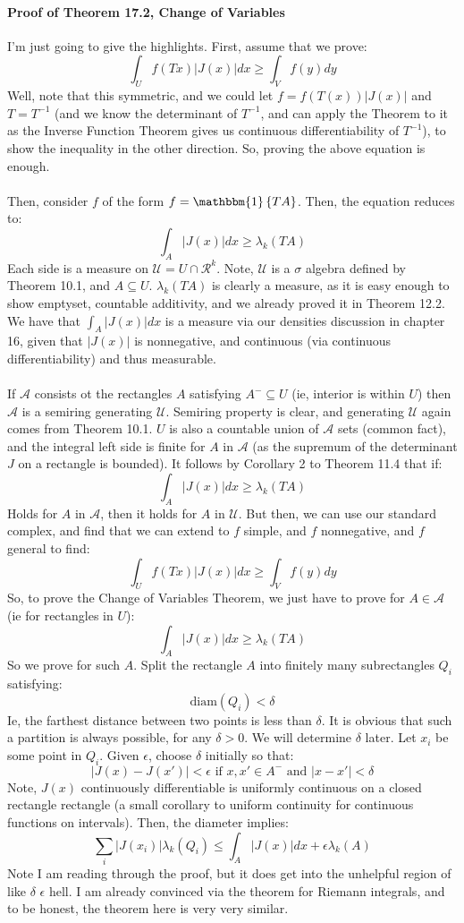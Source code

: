 \documentclass[12pt,a4paper]{article}
\newcommand{\1}[1]{\mathbbm{1}\left\{ #1 \right\}}
\newcommand{\acal}{\mathcal{A}}
\newcommand{\ucal}{\mathcal{U}}
\newcommand{\rcal}{\mathcal{R}}
\newcommand{\diam}{\text{diam}}
\begin{document}
\paragraph{Proof of Theorem 17.2, Change of Variables} 
I'm just going to give the highlights. First, assume that we prove:
$$
	\int_U f(Tx)|J(x)| dx \geq \int_V f(y) dy
$$
Well, note that this symmetric, and we could let $f = f(T(x))|J(x)|$ and $T = T^{-1}$ (and we know the determinant of $T^{-1}$, and can apply the Theorem to it as the Inverse Function Theorem gives us continuous differentiability of $T^{-1}$), to show the inequality in the other direction. So, proving the above equation is enough.
\\\\
Then, consider $f$ of the form $f = \1{TA}$. Then, the equation reduces to:
$$
	\int_A |J(x)| dx \geq \lambda_k(TA)
$$
Each side is a measure on $\ucal = U \cap \rcal^k$. Note, $\ucal$ is a $\sigma$ algebra defined by Theorem 10.1, and $A \subseteq U$. $\lambda_k(TA)$ is clearly a measure, as it is easy enough to show emptyset, countable additivity, and we already proved it in Theorem 12.2. We have that $\int_A |J(x)| dx$ is a measure via our densities discussion in chapter 16, given that $|J(x)|$ is nonnegative, and continuous (via continuous differentiability) and thus measurable.
\\\\
If $\acal$ consists ot the rectangles $A$ satisfying $A^- \subseteq U$ (ie, interior is within $U$) then $\acal$ is a semiring generating $\ucal$. Semiring property is clear, and generating $\ucal$ again comes from Theorem 10.1. $U$ is also a countable union of $\acal$ sets (common fact), and the integral left side is finite for $A$ in $\acal$ (as the supremum of the determinant $J$ on a rectangle is bounded). It follows by Corollary 2 to Theorem 11.4 that if:
$$
	\int_A |J(x)| dx \geq \lambda_k(TA)
$$
Holds for $A$ in $\acal$, then it holds for $A$ in $\ucal$. But then, we can use our standard complex, and find that we can extend to $f$ simple, and $f$ nonnegative, and $f$ general to find:
$$
	\int_U f(Tx)|J(x)| dx \geq \int_V f(y) dy
$$
So, to prove the Change of Variables Theorem, we just have to prove for $A \in \acal$ (ie for rectangles in $U$):
$$
	\int_A |J(x)| dx \geq \lambda_k(TA)
$$
So we prove for such $A$. Split the rectangle $A$ into finitely many subrectangles $Q_i$ satisfying:
$$
	\diam(Q_i) < \delta
$$
Ie, the farthest distance between two points is less than $\delta$. It is obvious that such a partition is always possible, for any $\delta > 0$. We will determine $\delta$ later. Let $x_i$ be some point in $Q_i$. Given $\epsilon$, choose $\delta$ initially so that:
$$
	\left|J(x) - J(x')\right| < \epsilon \text{ if $x,x' \in A^-$ and } |x - x'| < \delta
$$
Note, $J(x)$ continuously differentiable is uniformly continuous on a closed rectangle rectangle (a small corollary to uniform continuity for continuous functions on intervals). Then, the diameter implies:
$$
	\sum_i |J(x_i)|\lambda_k(Q_i) \leq \int_A |J(x)|dx + \epsilon \lambda_k(A)
$$
Note I am reading through the proof, but it does get into the unhelpful region of like $\delta$ $\epsilon$ hell. I am already convinced via the theorem for Riemann integrals, and to be honest, the theorem here is very very similar.
\end{document}
